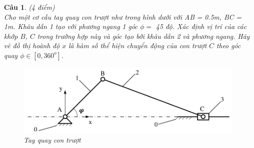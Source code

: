 \documentclass[11pt]{article}
\newtheorem{bt}{Câu}
\begin{document}
\begin{bt}(4 điểm) \\
	Cho một cơ cấu tay quay con trượt như trong hình dưới với AB = 0.5m, BC = 1m. Khâu dẫn 1 tạo với phương ngang 1 góc $\phi = $ 45 độ. Xác định vị trí của các khớp $B$, $C$ trong trường hợp này và góc tạo bởi khâu dẫn 2 và phương ngang. 
	Hãy vẽ đồ thị hoành độ $x$ là hàm số thể hiện chuyển động của con trượt $C$ theo góc quay $\phi \in [0,360^o]$.
	\begin{figure}[h!]
		\centering
		\includegraphics[width=0.7\linewidth]{Figures/tay_quay}
		\caption{Tay quay con trượt}
		\label{fig:tayquay}
	\end{figure}
\end{bt}
\end{document}

